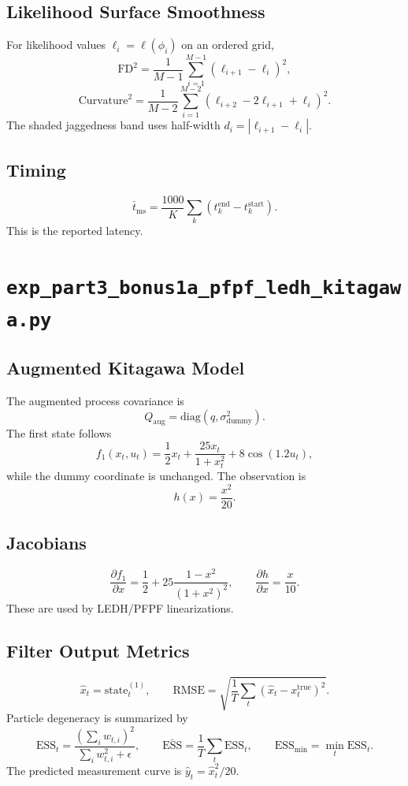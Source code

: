 \documentclass[11pt]{article}
\newcommand{\code}[1]{\texttt{#1}}
\newcommand{\diag}{\mathrm{diag}}
\newcommand{\RMSE}{\mathrm{RMSE}}
\newcommand{\ESS}{\mathrm{ESS}}
\begin{document}
\subsection*{Likelihood Surface Smoothness}
For likelihood values \(\ell_i=\ell(\phi_i)\) on an ordered grid,
\[
\mathrm{FD}^2=\frac{1}{M-1}\sum_{i=1}^{M-1}(\ell_{i+1}-\ell_i)^2,
\]
\[
\mathrm{Curvature}^2=\frac{1}{M-2}\sum_{i=1}^{M-2}(\ell_{i+2}-2\ell_{i+1}+\ell_i)^2.
\]
The shaded jaggedness band uses half-width \(d_i=|\ell_{i+1}-\ell_i|\).

\subsection*{Timing}
\[
\bar t_{\mathrm{ms}}=\frac{1000}{K}\sum_k(t^{\mathrm{end}}_k-t^{\mathrm{start}}_k).
\]
This is the reported latency.

\section{\code{exp\_part3\_bonus1a\_pfpf\_ledh\_kitagawa.py}}
\subsection*{Augmented Kitagawa Model}
The augmented process covariance is
\[
Q_{\mathrm{aug}}=\diag(q,\sigma_{\mathrm{dummy}}^2).
\]
The first state follows
\[
f_1(x_t,u_t)=\frac12x_t+\frac{25x_t}{1+x_t^2}+8\cos(1.2u_t),
\]
while the dummy coordinate is unchanged. The observation is
\[
h(x)=\frac{x^2}{20}.
\]

\subsection*{Jacobians}
\[
\frac{\partial f_1}{\partial x}
=\frac12+25\frac{1-x^2}{(1+x^2)^2},
\qquad
\frac{\partial h}{\partial x}=\frac{x}{10}.
\]
These are used by LEDH/PFPF linearizations.

\subsection*{Filter Output Metrics}
\[
\hat x_t=\mathrm{state}_t^{(1)},\qquad
\RMSE=\sqrt{\frac{1}{T}\sum_t(\hat x_t-x_t^{\mathrm{true}})^2}.
\]
Particle degeneracy is summarized by
\[
\ESS_t=\frac{(\sum_iw_{t,i})^2}{\sum_iw_{t,i}^2+\epsilon},\qquad
\bar{\ESS}=\frac{1}{T}\sum_t\ESS_t,\qquad
\ESS_{\min}=\min_t\ESS_t.
\]
The predicted measurement curve is \(\hat y_t=\hat x_t^2/20\).
\end{document}
